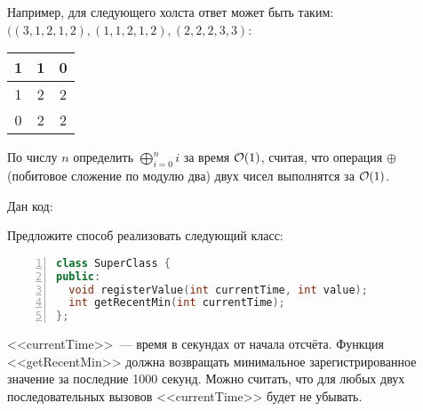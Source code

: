 \documentclass[addpoints]{exam}
\begin{document}
\begin{questions}
Например, для следующего холста ответ может быть таким: $((3,1,2,1,2), (1,1,2,1,2), (2,2,2,3,3)$:

\begin{center}
\begin{tabular}{|c|c|c|}
\hline 
1 & 1 & 0 \\ 
\hline 
1 & 2 & 2 \\ 
\hline 
0 & 2 & 2 \\ 
\hline 
\end{tabular} 
\end{center}

\question[2] По числу $n$ определить $\bigoplus\limits_{i=0}^{n} i$ за время $\mathcal{O}(1)$, считая, что операция $\oplus$ (побитовое сложение по модулю два) двух чисел выполнятся за $\mathcal{O}(1)$.

\question Дан код:





\question[2] Предложите способ реализовать следующий класс:

\begin{lstlisting}[language=C++,frame=single,numbers=left]
class SuperClass {
public:
  void registerValue(int currentTime, int value);
  int getRecentMin(int currentTime);
};
\end{lstlisting}

<<currentTime>>~--- время в секундах от начала отсчёта. Функция <<getRecentMin>> должна возвращать минимальное зарегистрированное значение за последние 1000 секунд. Можно считать, что для любых двух последовательных вызовов <<currentTime>> будет не убывать.

\end{questions}

\begin{center}
\pointtable[h][questions]
\end{center}
\end{document}
